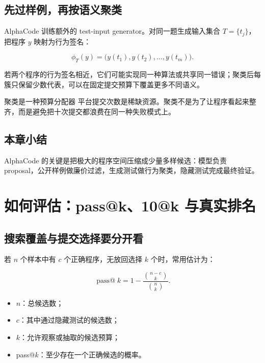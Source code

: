 \documentclass[a4paper]{article}
\begin{document}
\subsection{先过样例，再按语义聚类}


AlphaCode 训练额外的 test-input generator。对同一题生成输入集合 $T=\{t_j\}$，把程序 $y$ 映射为行为签名：

$$
\phi_T(y)=\bigl(y(t_1),y(t_2),\ldots,y(t_m)\bigr).
$$

若两个程序的行为签名相近，它们可能实现同一种算法或共享同一错误；聚类后每簇只保留少数代表，可以在固定提交预算下覆盖更多不同语义。

\begin{knowledgebox}{聚类是一种预算分配器}
平台提交次数是稀缺资源。聚类不是为了让程序看起来整齐，而是避免把十次提交都浪费在同一种失败模式上。
\end{knowledgebox}

\subsection{本章小结}

AlphaCode 的关键是把极大的程序空间压缩成少量多样候选：模型负责 proposal，公开样例做廉价过滤，生成测试做行为聚类，隐藏测试完成最终验证。

\section{如何评估：pass@k、10@k 与真实排名}

\subsection{搜索覆盖与提交选择要分开看}


若 $n$ 个样本中有 $c$ 个正确程序，无放回选择 $k$ 个时，常用估计为：

$$
\operatorname{pass@}k=1-\frac{\binom{n-c}{k}}{\binom{n}{k}}.
$$

\begin{itemize}
    \item $n$：总候选数；
    \item $c$：其中通过隐藏测试的候选数；
    \item $k$：允许观察或抽取的候选预算；
    \item pass@$k$：至少存在一个正确候选的概率。
\end{itemize}
\end{document}
